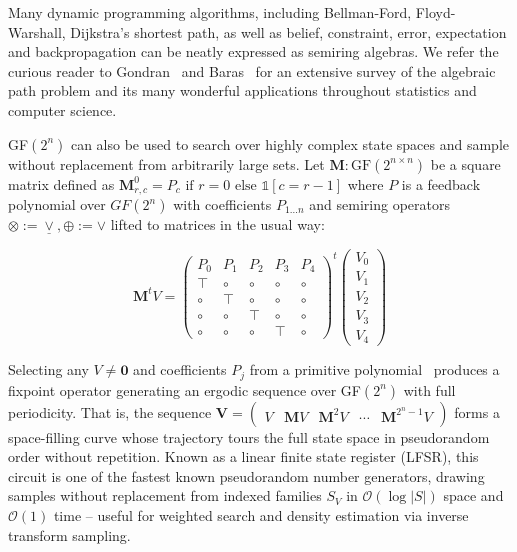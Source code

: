 \documentclass[sigplan,10pt,review,anonymous]{acmart}
\begin{document}
\noindent Many dynamic programming algorithms, including Bellman-Ford, Floyd-Warshall, Dijkstra's shortest path, as well as belief, constraint, error, expectation and backpropagation can be neatly expressed as semiring algebras. We refer the curious reader to Gondran~\citep{gondran2008graphs} and Baras~\citep{baras2010path} for an extensive survey of the algebraic path problem and its many wonderful applications throughout statistics and computer science.

GF$(2^n)$ can also be used to search over highly complex state spaces and sample without replacement from arbitrarily large sets. Let $\textbf{M}: \text{GF}(2^{n\times n})$ be a square matrix defined as $\mathbf{M}^0_{r, c} = P_c \text{ if } r=0 \text{ else } \mathds{1}[c = r - 1]$ where $P$ is a feedback polynomial over $GF(2^n)$ with coefficients $P_{1\ldots n}$ and semiring operators $\otimes := \underline{\vee}, \oplus := \vee$ lifted to matrices in the usual way:

\vspace{-7}
\[
\mathbf{M}^tV = \begin{pmatrix}
  P_0 & P_1 & P_2 & P_3 & P_4 \\
  \top & \circ & \circ & \circ & \circ \\
  \circ & \top & \circ & \circ & \circ \\
  \circ & \circ & \top & \circ & \circ \\
  \circ & \circ & \circ & \top & \circ
\end{pmatrix}^t
\begin{pmatrix}
      V_0 \\
      V_1 \\
      V_2 \\
      V_3 \\
      V_4
\end{pmatrix}
\]

Selecting any $V \neq \mathbf{0}$ and coefficients $P_j$ from a primitive polynomial~\citep{saxena2004primitive} produces a fixpoint operator generating an ergodic sequence over GF$(2^n)$ with full periodicity. That is, the sequence $\mathbf{V} = \begin{pmatrix}V & \mathbf{M}V & \mathbf{M}^{2}V & \cdots & \mathbf{M}^{2^n-1}V \end{pmatrix}$ forms a space-filling curve whose trajectory tours the full state space in pseudorandom order without repetition. Known as a linear finite state register (LFSR), this circuit is one of the fastest known pseudorandom number generators, drawing samples without replacement from indexed families $S_V$ in $\mathcal{O}(\log |S|)$ space and $\mathcal{O}(1)$ time -- useful for weighted search and density estimation via inverse transform sampling.
\end{document}
